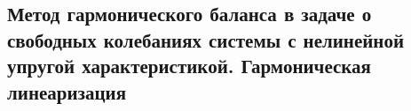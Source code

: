 

\subsection{Метод гармонического баланса в задаче о свободных колебаниях системы с нелинейной упругой характеристикой. Гармоническая линеаризация}



